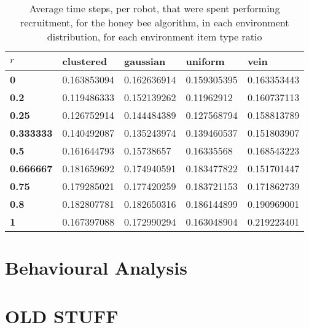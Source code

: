 \begin{table}[]
\centering
\caption{Average time steps, per robot, that were spent performing recruitment, for the honey bee algorithm, in each environment distribution, for each environment item type ratio}
\label{averagetimerecruitment}
\begin{tabular}{@{}lllll@{}}
\toprule
$r$            & \textbf{clustered} & \textbf{gaussian} & \textbf{uniform} & \textbf{vein} \\ \midrule
\textbf{0}        & 0.163853094        & 0.162636914       & 0.159305395      & 0.163353443   \\
\textbf{0.2}      & 0.119486333        & 0.152139262       & 0.11962912       & 0.160737113   \\
\textbf{0.25}     & 0.126752914        & 0.144484389       & 0.127568794      & 0.158813789   \\
\textbf{0.333333} & 0.140492087        & 0.135243974       & 0.139460537      & 0.151803907   \\
\textbf{0.5}      & 0.161644793        & 0.15738657        & 0.16335568       & 0.168543223   \\
\textbf{0.666667} & 0.181659692        & 0.174940591       & 0.183477822      & 0.151701447   \\
\textbf{0.75}     & 0.179285021        & 0.177420259       & 0.183721153      & 0.171862739   \\
\textbf{0.8}      & 0.182807781        & 0.182650316       & 0.186144899      & 0.190969001   \\
\textbf{1}        & 0.167397088        & 0.172990294       & 0.163048904      & 0.219223401   \\ \bottomrule
\end{tabular}
\end{table}
\section{Behavioural Analysis}
\label{results:behaviouralanalysis}



\section{OLD STUFF}

